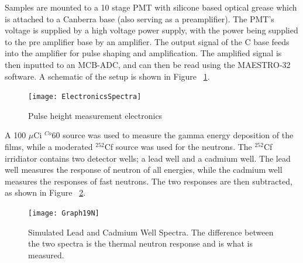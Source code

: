 \documentclass{anstrans}
\newcommand{\iso}[2]{${}^{#2}${#1}}
\begin{document}
Samples are mounted to a 10 stage PMT with silicone based optical grease which is attached to a Canberra base (also serving as a preamplifier).   
The PMT's voltage is supplied by a high voltage power supply, with the power being supplied to the pre amplifier base by an amplifier.  
The output signal of the C base feeds into the amplifier for pulse shaping and amplification. 
The amplified signal is then inputted to an MCB-ADC, and can then be read using the MAESTRO-32 software. 
A schematic of the setup is shown in Figure ~\ref{fig:ElectronicsSpectra}.
\begin{figure}
	\centering
	\texttt{[image: ElectronicsSpectra]}
	\caption{Pulse height measurement electronics}
	\label{fig:ElectronicsSpectra}
\end{figure}
A 100 $\mu$Ci \iso{60}{Co} source was used to measure the gamma energy deposition of the films, while a moderated \iso{Cf}{252} source was used for the neutrons.
The \iso{Cf}{252} irridiator contains two detector wells; a lead well and a cadmium well.
The lead well measures the response of neutron of all energies, while the cadmium well measures the responses of fast neutrons.
The two responses are then subtracted, as shown in Figure ~\ref{fig:SimPbCdSpectra}.
\begin{figure}
	\centering
	\texttt{[image: Graph19N]}
	\caption{Simulated Lead and Cadmium Well Spectra. The difference between the two spectra is the thermal neutron response and is what is measured.}
	\label{fig:SimPbCdSpectra}
\end{figure}
\end{document}
